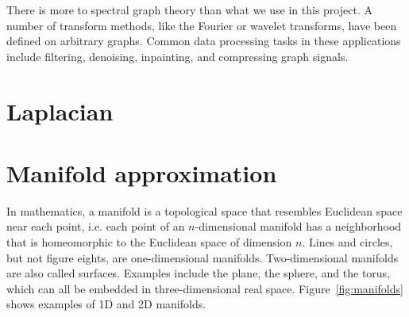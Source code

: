 \documentclass[a4paper,12pt,twoside]{report}
\newcommand{\figref}[1]{Figure~\ref{#1}}
\begin{document}
There is more to spectral graph theory than what we use in this project. A number of transform methods, like the Fourier or wavelet transforms, have been defined on arbitrary graphs. Common data processing tasks in these applications include filtering, denoising, inpainting, and compressing graph signals.


\section{Laplacian}

\section{Manifold approximation}

In mathematics, a manifold is a topological space that resembles Euclidean space near each point, i.e. each point of an $n$-dimensional manifold has a neighborhood that is homeomorphic to the Euclidean space of dimension $n$. Lines and circles, but not figure eights, are one-dimensional manifolds. Two-dimensional manifolds are also called surfaces. Examples include the plane, the sphere, and the torus, which can all be embedded in three-dimensional real space. \figref{fig:manifolds} shows examples of 1D and 2D manifolds.
\end{document}
